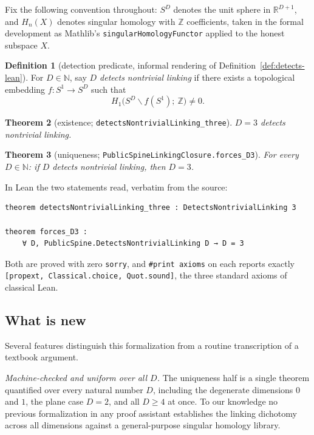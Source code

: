 \documentclass[11pt]{article}
\newtheorem{theorem}{Theorem}[section]
\theoremstyle{definition}
\newtheorem{definition}[theorem]{Definition}
\newcommand{\Z}{\mathbb{Z}}
\newcommand{\R}{\mathbb{R}}
\newcommand{\N}{\mathbb{N}}
\newcommand{\Sph}[1]{S^{#1}}
\newcommand{\lean}[1]{\texttt{#1}}
\begin{document}
Fix the following convention throughout: $\Sph{D}$ denotes the unit sphere in $\R^{D+1}$, and $H_n(X)$ denotes singular homology with $\Z$ coefficients, taken in the formal development as Mathlib's \lean{singularHomologyFunctor} applied to the honest subspace $X$.

\begin{definition}[detection predicate, informal rendering of Definition~\ref{def:detects-lean}]
\label{def:detects}
For $D \in \N$, say \emph{$D$ detects nontrivial linking} if there exists a topological embedding $f \colon S^1 \to \Sph{D}$ such that
\[
H_1\bigl(\Sph{D} \smallsetminus f(S^1);\ \Z\bigr) \neq 0 .
\]
\end{definition}

\begin{theorem}[existence; \lean{detectsNontrivialLinking\_three}]
\label{thm:existence}
$D = 3$ detects nontrivial linking.
\end{theorem}

\begin{theorem}[uniqueness; \lean{PublicSpineLinkingClosure.forces\_D3}]
\label{thm:uniqueness}
For every $D \in \N$: if $D$ detects nontrivial linking, then $D = 3$.
\end{theorem}

In Lean the two statements read, verbatim from the source:

\begin{lstlisting}
theorem detectsNontrivialLinking_three : DetectsNontrivialLinking 3

theorem forces_D3 :
    ∀ D, PublicSpine.DetectsNontrivialLinking D → D = 3
\end{lstlisting}

Both are proved with zero \lean{sorry}, and \lean{\#print axioms} on each reports exactly \lean{[propext, Classical.choice, Quot.sound]}, the three standard axioms of classical Lean.

\subsection{What is new}

Several features distinguish this formalization from a routine transcription of a textbook argument.

\emph{Machine-checked and uniform over all $D$.} The uniqueness half is a single theorem quantified over every natural number $D$, including the degenerate dimensions $0$ and $1$, the plane case $D=2$, and all $D \geq 4$ at once. To our knowledge no previous formalization in any proof assistant establishes the linking dichotomy across all dimensions against a general-purpose singular homology library.
\end{document}
